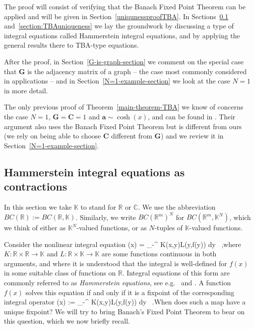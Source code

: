 \documentclass[12pt]{article}
\theoremstyle{plain}
\theoremstyle{definition}
\numberwithin{equation}{section}
\numberwithin{theorem}{section}
\def\be#1\ee{\begin{equation}#1\end{equation}}
\renewcommand{\vec}[1]{\mathbf{#1}}
\begin{document}
The proof will consist of verifying that the Banach Fixed Point Theorem can be applied and will be given in Section~\ref{uniqunessproofTBA}. In Sections~\ref{hammerstein-section} and~\ref{section:TBAuniqueness} we lay the groundwork by discussing a type of integral equations called Hammerstein integral equations, and by applying the general results there to TBA-type equations. 

After the proof, in Section~\ref{G-is-graph-section} we comment on the special case that $\vec{G}$ is the adjacency matrix of a graph -- the case most commonly considered in applications -- and in Section~\ref{N=1-example-section} we look at the case $N=1$ in more detail.

The only previous proof of Theorem~\ref{main-theorem-TBA} we know of 
concerns the case 
	$N=1$, $\vec{G}=\vec{C}=1$ and $\vec{a} \sim \cosh(x)$, and
can be found in \cite{FringKorffSchulz}.
Their argument 
	also uses the Banach Fixed Point Theorem but is different from ours (we rely on being able to choose $\vec{C}$ different from $\vec{G}$) and we review it in Section~\ref{N=1-example-section}. 


\subsection{Hammerstein integral equations as contractions}
\label{hammerstein-section}

In this section we take $\mathbb{K}$ to stand for $\mathbb{R}$ or $\mathbb{C}$. We use the abbreviation
$BC(\mathbb{R}) := BC(\mathbb{R},\mathbb{K})$. Similarly, we write $BC(\mathbb{R}^m)^N$ for $BC(\mathbb{R}^m,\mathbb{K}^N)$, which we think of either as $\mathbb{K}^N$-valued functions, or as $N$-tuples of $\mathbb{K}$-valued functions.

\medskip

Consider the nonlinear integral equation 
\be
f(x) = \int_{-\infty}^{\infty} K(x,y)L(y,f(y)) dy \ ,\ee where 
	$K:\mathbb{R}\times\mathbb{R}\rightarrow\mathbb{K}$ and
	$L:\mathbb{R}\times\mathbb{K}\rightarrow\mathbb{K}$ 
are some functions continuous in both arguments, and where it is understood that the integral is well-defined for  $f(x)$ in some suitable class of functions on $\mathbb{R}$. Integral equations of this form are commonly referred to as \textsl{Hammerstein equations}, see e.g.\ \cite[I.3]{Krasnoselskii}
	and \cite[Ch.\,16]{Polyanin}.
A function $f(x)$ solves this equation if and only if it is a fixpoint of the corresponding integral operator 
\be
A[f](x) := \int_{-\infty}^{\infty} K(x,y)L(y,f(y)) dy \ .\ee When does such a map have a unique fixpoint? We will try to bring Banach's Fixed Point Theorem to bear on this question, which we now briefly recall.
\end{document}
